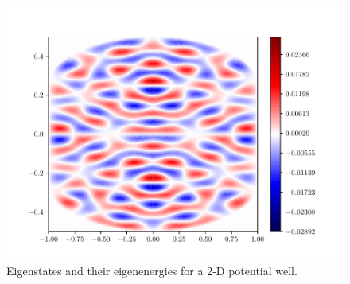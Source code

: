 \documentclass{article}
\begin{document}
\begin{enumerate}[1.]
\begin{enumerate}[(A)]
\begin{enumerate}[(i)]
\begin{figure}[H]
\begin{minipage}{0.3\linewidth}
          \includegraphics[width=\linewidth]{q6c-199.pdf}
          \caption*{$E_{199}= 757.6928364999236$}
        \end{minipage}
        \caption{Eigenstates and their eigenenergies for a 2-D potential well.}
        \label{fig:q6c-3}
      \end{figure}
    \end{enumerate}
  \end{enumerate}

\end{enumerate}
\end{document}
